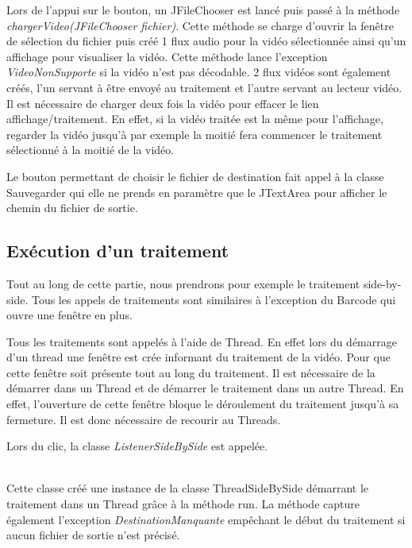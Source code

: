 \documentclass[10pt,a4paper]{article}
\begin{document}
Lors de l'appui sur le bouton, un JFileChooser est lancé puis passé à la méthode \textit{chargerVideo(JFileChooser fichier)}.
Cette méthode se charge d'ouvrir la fenêtre de sélection du fichier puis créé 1 flux audio pour la vidéo sélectionnée ainsi qu'un affichage pour visualiser la vidéo. Cette méthode lance l'exception
\textit{VideoNonSupporte} si la vidéo n'est pas décodable.
2 flux vidéos sont également créés, l'un servant à être envoyé au traitement et l'autre servant au lecteur vidéo. Il est
nécessaire de charger deux fois la vidéo pour effacer le lien affichage/traitement. En effet, si la vidéo traitée est la même pour l'affichage, regarder la vidéo jusqu'à par exemple la moitié fera commencer
le traitement sélectionné à la moitié de la vidéo.


Le bouton permettant de choisir le fichier de destination fait appel à la classe Sauvegarder qui elle ne prends en paramètre que le JTextArea pour afficher le chemin du fichier de sortie.

\subsection{Exécution d'un traitement}

Tout au long de cette partie, nous prendrons pour exemple le traitement side-by-side. Tous les appels de traitements sont similaires à l'exception du Barcode qui ouvre une fenêtre en plus.

Tous les traitements sont appelés à l'aide de Thread. En effet lors du démarrage d'un thread une fenêtre est crée informant du traitement de la vidéo. Pour que cette fenêtre soit présente
tout au long du traitement. Il est nécessaire de la démarrer dans un Thread et de démarrer le traitement dans un autre Thread. En effet, l'ouverture de cette fenêtre bloque le déroulement du traitement
jusqu'à sa fermeture. Il est donc nécessaire de recourir au Threads.

Lors du clic, la classe \textit{ListenerSideBySide} est appelée.


~~\\

Cette classe créé une instance de la classe ThreadSideBySide démarrant le traitement dans un Thread grâce à la méthode run. La méthode capture également l'exception \textit{DestinationManquante} empêchant
le début du traitement si aucun fichier de sortie n'est précisé.
\end{document}
